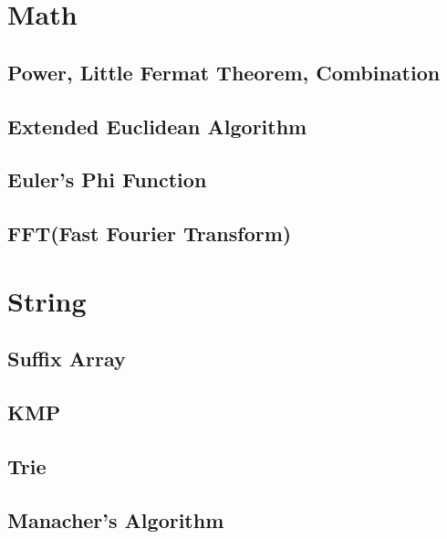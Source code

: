 \documentclass[10pt, a4paper]{article}
\begin{document}
\tableofcontents



\section{Math}

\subsection{Power, Little Fermat Theorem, Combination}


\subsection{Extended Euclidean Algorithm}


\subsection{Euler's Phi Function}


\subsection{FFT(Fast Fourier Transform)}




\section{String}

\subsection{Suffix Array}


\subsection{KMP}


\subsection{Trie}


\subsection{Manacher's Algorithm}

\end{document}
